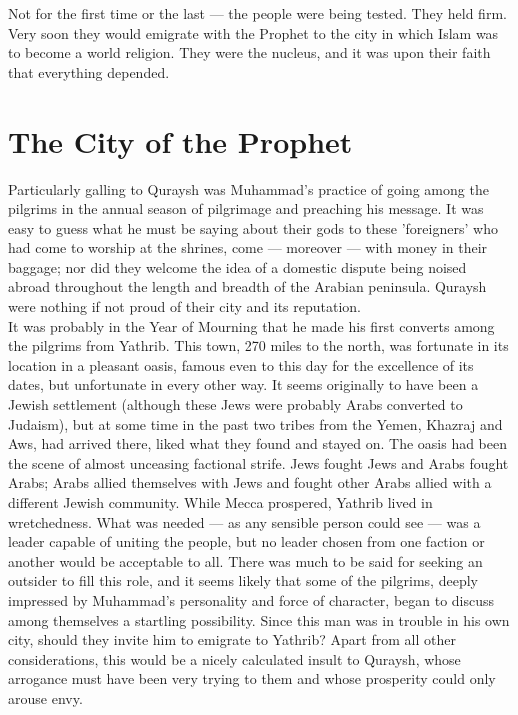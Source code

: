 \documentclass[11pt, b5paper, twoside]{book}
\begin{document}
Not for the first time or the last --- the people were being tested. They held firm. Very soon they 
would emigrate with the Prophet to the city in which Islam was to become a world religion. They were 
the nucleus, and it was upon their faith that everything depended. \\

\chapter{The City of the Prophet}


Particularly galling to Quraysh was Muhammad's practice of going among the pilgrims in the annual 
season of pilgrimage and preaching his message. It was easy to guess what he must be saying about 
their gods to these 'foreigners' who had come to worship at the shrines, come --- moreover --- with money in their baggage; nor did they welcome the idea of a domestic dispute being noised abroad throughout the length and breadth of the Arabian peninsula. Quraysh were nothing if not proud of their city and its reputation. \\

It was probably in the Year of Mourning that he made his first converts among the pilgrims from 
Yathrib. This town, 270 miles to the north, was fortunate in its location in a pleasant oasis, famous 
even to this day for the excellence of its dates, but unfortunate in every other way. It seems 
originally to have been a Jewish settlement (although these Jews were probably Arabs converted to 
Judaism), but at some time in the past two tribes from the Yemen, Khazraj and Aws, had arrived there, 
liked what they found and stayed on. The oasis had been the scene of almost unceasing factional 
strife. Jews fought Jews and Arabs fought Arabs; Arabs allied themselves with Jews and fought other 
Arabs allied with a different Jewish community. While Mecca prospered, Yathrib lived in wretchedness. 
What was needed --- as any sensible person could see --- was a leader capable of uniting the people, but 
no leader chosen from one faction or another would be acceptable to all. There was much to be said 
for seeking an outsider to fill this role, and it seems likely that some of the pilgrims, deeply 
impressed by Muhammad's personality and force of character, began to discuss among themselves a 
startling possibility. Since this man was in trouble in his own city, should they invite him to 
emigrate to Yathrib? Apart from all other considerations, this would be a nicely calculated insult to 
Quraysh, whose arrogance must have been very trying to them and whose prosperity could only arouse 
envy. \\
\end{document}
